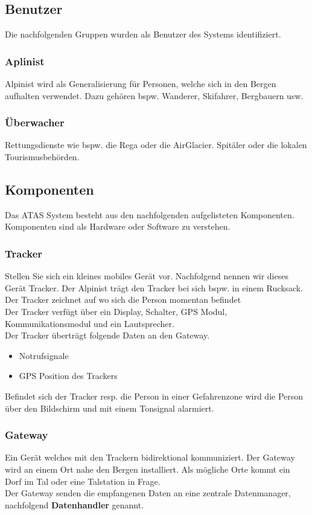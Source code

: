 \documentclass[11pt,english,german]{report}
\theoremstyle{definition}
\begin{document}
\newpage
\subsection{Benutzer}
Die nachfolgenden Gruppen wurden als Benutzer des Systems identifiziert.
\subsubsection{Aplinist}
Alpinist wird als Generalisierung für Personen, welche sich in den Bergen aufhalten verwendet. Dazu gehören bspw. Wanderer, Skifahrer, Bergbauern usw.
\subsubsection{Überwacher}
Rettungsdienste wie bspw. die Rega oder die AirGlacier. Spitäler oder die lokalen Tourismusbehörden.

\subsection{Komponenten}
Das ATAS System besteht aus den nachfolgenden aufgelisteten Komponenten. Komponenten sind als Hardware oder Software zu verstehen.
\subsubsection{Tracker}
Stellen Sie sich ein kleines mobiles Gerät vor. Nachfolgend nennen wir dieses Gerät Tracker. Der Alpinist trägt den Tracker bei sich bspw. in einem Rucksack. Der Tracker zeichnet auf wo sich die Person momentan befindet\\ [0.3cm] 
Der Tracker verfügt über ein Display, Schalter, GPS Modul, Kommunikationsmodul und ein Lautsprecher.\\ [0.3cm]
Der Tracker überträgt folgende Daten an den Gateway.
\begin{itemize}
	\item Notrufsignale
	\item GPS Position des Trackers
\end{itemize}
Befindet sich der Tracker resp. die Person in einer Gefahrenzone wird die Person über den Bildschirm und mit einem Tonsignal alarmiert.
\subsubsection{Gateway}
Ein Gerät welches mit den Trackern bidirektional kommuniziert. Der Gateway wird an einem Ort nahe den Bergen installiert. Als mögliche Orte kommt ein Dorf im Tal oder eine Talstation in Frage.\bigskip \\
Der Gateway senden die empfangenen Daten an eine zentrale Datenmanager, nachfolgend \textbf{Datenhandler} genannt.
\end{document}
